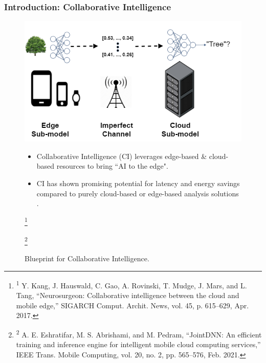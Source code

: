 \documentclass[aspectratio=169]{beamer}
\newcommand\blfootnote[1]{%
	\begingroup
	\renewcommand\thefootnote{}\footnote{#1}%
	\addtocounter{footnote}{-1}%
	\endgroup
}
\begin{document}
\begin{frame}
	\frametitle{Introduction: Collaborative Intelligence}
		\begin{figure}
		\begin{minipage}{.48\textwidth}
			\includegraphics[width=\linewidth]{image--000.png}
			\caption{Blueprint for Collaborative Intelligence. \cite{neurosurgeon}}
		\end{minipage}\hfill
		\begin{minipage}{.48\textwidth}
		\begin{itemize}
		    \item Collaborative Intelligence (CI) leverages edge-based \& cloud-based resources to bring ``AI to the edge". 
		    \item CI has shown promising potential for latency and energy savings compared to purely cloud-based or edge-based analysis solutions \cite{neurosurgeon,jointdnn}.
		\end{itemize}
		\end{minipage}
		\blfootnote{\tiny \textsuperscript{1} Y. Kang, J. Hauswald, C. Gao, A. Rovinski, T. Mudge, J. Mars, and L. Tang, “Neurosurgeon: Collaborative intelligence between the cloud and mobile edge,” SIGARCH Comput. Archit. News, vol. 45, p. 615–629, Apr. 2017.}
		\blfootnote{\tiny \textsuperscript{2} A. E. Eshratifar, M. S. Abrishami, and M. Pedram, “JointDNN: An efficient training and inference engine for intelligent mobile cloud computing services,” IEEE Trans. Mobile Computing, vol. 20, no. 2, pp. 565–576, Feb. 2021.}
	\end{figure}
\end{frame}
\end{document}
